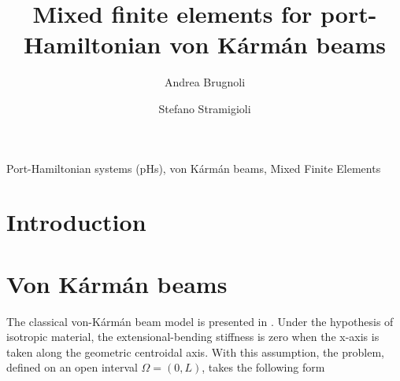 \documentclass{ifacconf}
\begin{document}
\begin{frontmatter}

\title{Mixed finite elements for port-Hamiltonian von K\'arm\'an beams} 


\author[UT]{Andrea Brugnoli}
\author[UT]{Stefano Stramigioli}
\address[UT]{University of Twente, Enschede (NL) \\
	a.brugnoli@utwente.nl, s.stramigioli@utwente.nl }

\begin{abstract}

\end{abstract}

\begin{keyword}
Port-Hamiltonian systems (pHs), von K\'arm\'an beams, Mixed Finite Elements
\end{keyword}

\end{frontmatter}

\section{Introduction}

\section{Von K\'arm\'an beams}


The classical von-K\'arm\'an beam model is presented in \cite[Chapter 4]{reddy2010introduction}. Under the hypothesis of isotropic material, the extensional-bending stiffness is zero when the x-axis is taken along the geometric centroidal axis. With this assumption, the problem, defined on an open interval $\Omega = (0, L)$, takes the following form
\end{document}
